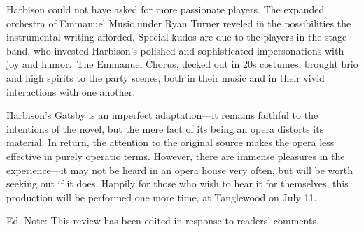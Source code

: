 Harbison could not have asked for more passionate players. The expanded orchestra of Emmanuel Music under Ryan Turner reveled in the possibilities the instrumental writing afforded. Special kudos are due to the players in the stage band, who invested Harbison’s polished and sophisticated impersonations with joy and humor. The Emmanuel Chorus, decked out in 20s costumes, brought brio and high spirits to the party scenes, both in their music and in their vivid interactions with one another.

Harbison’s Gatsby is an imperfect adaptation—it remains faithful to the intentions of the novel, but the mere fact of its being an opera distorts its material. In return, the attention to the original source makes the opera less effective in purely operatic terms. However, there are immense pleasures in the experience—it may not be heard in an opera house very often, but will be worth seeking out if it does. Happily for those who wish to hear it for themselves, this production will be performed one more time, at Tanglewood on July 11.

Ed. Note: This review has been edited in response to readers' comments.